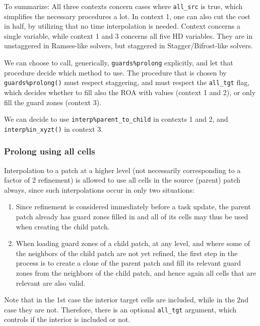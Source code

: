\documentclass[paper=a4,fontsize=11pt]{scrartcl}
\numberwithin{equation}{section}		%
\numberwithin{figure}{section}			%
\numberwithin{table}{section}				%
\newcommand{\codecolor}{\color{Blue}}
\newcommand{\Code}[1]{{\codecolor\texttt{#1}}}
\begin{document}
To summarize:  All three contexts concern cases where \verb|all_src| is true, which simplifies the necessary procedures a lot.  In context 1, one can also cut the cost in half, by utilizing that no time interpolation is needed.  Context concerns a single variable, while context 1 and 3 concerns all five HD variables.  They are in unstaggered in Ramses-like solvers, but staggered in Stagger/Bifrost-like solvers.

We can choose to call, generically, \verb|guards%prolong| explicitly, and let that procedure decide which method to use.  The procedure that is chosen by \verb|guards%prolong()| must respect staggering, and must respect the \verb|all_tgt| flag, which decides whether to fill also the ROA with values (context 1 and 2), or only fill the guard zones (context 3).

We can decide to use \verb|interp%parent_to_child| in contexts 1 and 2, and \verb|interp%in_xyzt()| in context 3.

\subsubsection{Prolong using all cells}
Interpolation to a patch at a higher level (not necessarily corresponding to a factor of 2 refinement) is allowed to use all cells in the source (parent) patch always, since such interpolations occur in only two situations:
\begin{enumerate}
    \item Since refinement is considered immediately before a task update, the parent patch already has guard zones filled in and all of its cells may thus be used when creating the child patch.
    \item When loading guard zones of a child patch, at any level, and where some of the neighbors of the child patch are not yet refined, the first step in the process is to create a clone of the parent patch and fill its relevant guard zones from the neighbors of the child patch, and hence again all cells that are relevant are also valid. 
\end{enumerate}
Note that in the 1st case the interior target cells are included, while in the 2nd case they are not. Therefore, there is an optional \Code{all\_tgt} argument, which controls if the interior is included or not.

\end{document}
